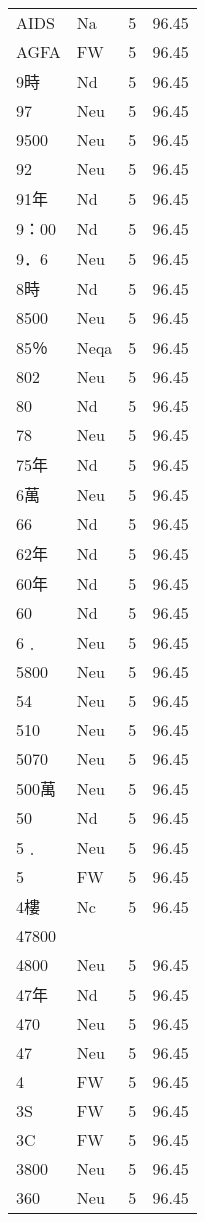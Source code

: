 \documentclass[twocolumn]{book}
\begin{document}
\begin{supertabular}{llrr}
AIDS & Na & 5 &  96.45\\
AGFA & FW & 5 &  96.45\\
9時 & Nd & 5 &  96.45\\
97 & Neu & 5 &  96.45\\
9500 & Neu & 5 &  96.45\\
92 & Neu & 5 &  96.45\\
91年 & Nd & 5 &  96.45\\
9：00 & Nd & 5 &  96.45\\
9．6 & Neu & 5 &  96.45\\
8時 & Nd & 5 &  96.45\\
8500 & Neu & 5 &  96.45\\
85％ & Neqa & 5 &  96.45\\
802 & Neu & 5 &  96.45\\
80 & Nd & 5 &  96.45\\
78 & Neu & 5 &  96.45\\
75年 & Nd & 5 &  96.45\\
6萬 & Neu & 5 &  96.45\\
66 & Nd & 5 &  96.45\\
62年 & Nd & 5 &  96.45\\
60年 & Nd & 5 &  96.45\\
60 & Nd & 5 &  96.45\\
6﹒ & Neu & 5 &  96.45\\
5800 & Neu & 5 &  96.45\\
54 & Neu & 5 &  96.45\\
510 & Neu & 5 &  96.45\\
5070 & Neu & 5 &  96.45\\
500萬 & Neu & 5 &  96.45\\
50 & Nd & 5 &  96.45\\
5﹒ & Neu & 5 &  96.45\\
5 & FW & 5 &  96.45\\
4樓 & Nc & 5 &  96.45\\
47800\\
4800 & Neu & 5 &  96.45\\
47年 & Nd & 5 &  96.45\\
470 & Neu & 5 &  96.45\\
47 & Neu & 5 &  96.45\\
4 & FW & 5 &  96.45\\
3S & FW & 5 &  96.45\\
3C & FW & 5 &  96.45\\
3800 & Neu & 5 &  96.45\\
360 & Neu & 5 &  96.45\\

\end{supertabular}
\end{document}
